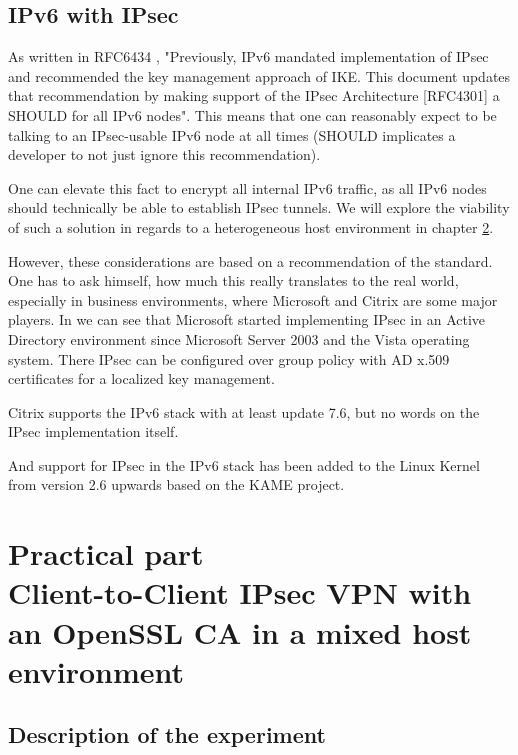 \documentclass[a4paper]{report}
\begin{document}
\section{IPv6 with IPsec}
\label{sec:IPv6IPsec}

As written in RFC6434 \parencite{Jankiewicz2011}, "Previously, IPv6 mandated implementation of IPsec and recommended the key management approach of IKE. This document updates that recommendation by making support of the IPsec Architecture [RFC4301] a SHOULD for all IPv6 nodes". This means that one can reasonably expect to be talking to an IPsec-usable IPv6 node at all times (SHOULD implicates a developer to not just ignore this recommendation).

One can elevate this fact to encrypt all internal IPv6 traffic, as all IPv6 nodes should technically be able to establish IPsec tunnels. We will explore the viability of such a solution in regards to a heterogeneous host environment in chapter \ref{ch:Practical}.

However, these considerations are based on a recommendation of the standard. One has to ask himself, how much this really translates to the real world, especially in business environments, where Microsoft and Citrix are some major players.
In \cite{MicrosoftTechnet2003} we can see that Microsoft started implementing IPsec in an Active Directory environment since Microsoft Server 2003 and the Vista operating system. There IPsec can be configured over group policy with AD x.509 certificates for a localized key management.

Citrix supports the IPv6 stack with at least update 7.6, but no words on the IPsec implementation itself. \parencite{Citrix2015}

And support for IPsec in the IPv6 stack has been added to the Linux Kernel from version 2.6 upwards based on the KAME project. \parencite{Spenneberg2003}

\chapter[Practical part\\Client-to-Client IPsec VPN with an OpenSSL CA in a mixed host environment]{Practical part\\\large{Client-to-Client IPsec VPN with an OpenSSL CA in a mixed host environment}}
\label{ch:Practical}

\section{Description of the experiment}
\label{sec:ExpDesc}
\end{document}
